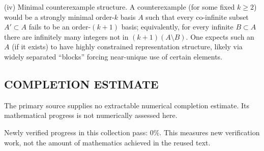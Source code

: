 (iv) Minimal counterexample structure.
A counterexample (for some fixed $k\ge 2$) would be a strongly minimal order-$k$ basis $A$ such that every co-infinite subset $A'\subset A$ fails to be an order-$(k+1)$ basis; equivalently, for every infinite $B\subset A$ there are infinitely many integers not in $(k+1)(A\setminus B)$. One expects such an $A$ (if it exists) to have highly constrained representation structure, likely via widely separated “blocks” forcing near-unique use of certain elements.




\subsection*{COMPLETION ESTIMATE}
The primary source supplies no extractable numerical completion estimate. Its mathematical progress is not numerically assessed here.

Newly verified progress in this collection pass: $0\%$. This measures new verification work, not the amount of mathematics achieved in the reused text.
